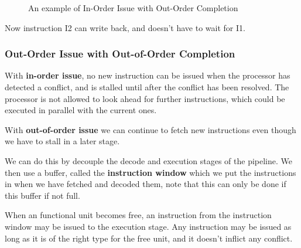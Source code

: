 \begin{figure}[H]
  \centering
  \caption{An example of In-Order Issue with Out-Order Completion}
  \label{fig:IOI-OOC}
\end{figure}

Now instruction I2 can write back, and doesn't have to wait for I1.

\subsubsection{Out-Order Issue with Out-of-Order Completion}
With \textbf{in-order issue}, no new instruction can be issued when the processor has detected a conflict, and is stalled until after the conflict has been resolved. The processor is not allowed to look ahead for further instructions, which could be executed in parallel with the current ones.

With \textbf{out-of-order issue} we can continue to fetch new instructions even though we have to stall in a later stage.

We can do this by decouple the decode and execution stages of the pipeline. We then use a buffer, called the \textbf{instruction window} which we put the instructions in when we have fetched and decoded them, note that this can only be done if this buffer if not full.

When an functional unit becomes free, an instruction from the instruction window may be issued to the execution stage. Any instruction may be issued as long as it is of the right type for the free unit, and it doesn't inflict any conflict.

